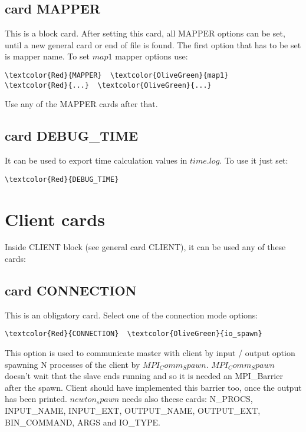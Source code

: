 \subsection{card MAPPER}
This is a block card. After setting this card, all MAPPER options can be set, until a new general card or end of file is found. The first option that has to be set is mapper name. To set $map1$ mapper options use:
\begin{Verbatim}[frame=single,commandchars=\\\{\}]
\textcolor{Red}{MAPPER}  \textcolor{OliveGreen}{map1}
\textcolor{Red}{...}  \textcolor{OliveGreen}{...}
\end{Verbatim}
Use any of the MAPPER cards after that.

\subsection{card DEBUG_TIME}
It can be used to export time calculation values in $time.log$. To use it just set:
\begin{Verbatim}[frame=single,commandchars=\\\{\}]
\textcolor{Red}{DEBUG_TIME}
\end{Verbatim}


\section{Client cards}

Inside CLIENT block (see general card CLIENT), it can be used any of these cards:

\subsection{card CONNECTION}
This is an obligatory card. Select one of the connection mode options: 
\begin{Verbatim}[frame=single,commandchars=\\\{\}]
\textcolor{Red}{CONNECTION}  \textcolor{OliveGreen}{io_spawn}
\end{Verbatim}
This option is used to communicate master with client by input / output option spawning N processes of the client by $MPI_Comm_Spawn$. $MPI_Comm_Spawn$ doesn't wait that the slave ends running and so it is needed an MPI_Barrier after the spawn. Client should have implemented this barrier too, once the output has been printed. $newton_spawn$ needs also theese cards: N_PROCS, INPUT_NAME, INPUT_EXT, OUTPUT_NAME, OUTPUT_EXT, BIN_COMMAND, ARGS and IO_TYPE.

